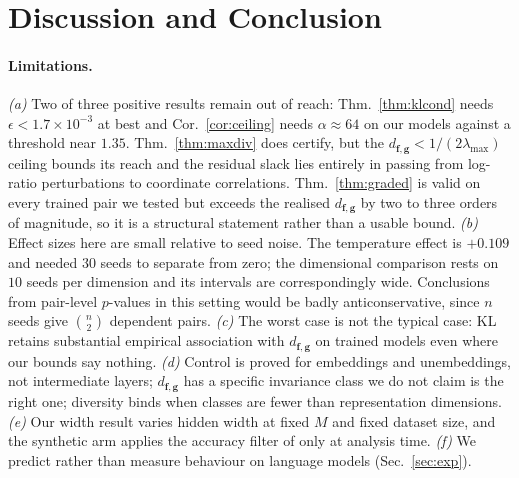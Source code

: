 \documentclass[10pt,letterpaper,twocolumn]{article}
\newcommand{\bff}{\mathbf{f}}
\newcommand{\bfg}{\mathbf{g}}
\newcommand{\dfg}{d_{\bff,\bfg}}
\theoremstyle{plain}
\theoremstyle{definition}
\theoremstyle{remark}
\begin{document}
\section{Discussion and Conclusion}
\label{sec:discussion}

\paragraph{Limitations.}
\emph{(a)} Two of three positive results remain out of reach:
Thm.~\ref{thm:klcond} needs $\epsilon<1.7\times10^{-3}$ at best and
Cor.~\ref{cor:ceiling} needs $\alpha\approx64$ on our models against a
threshold near $1.35$. Thm.~\ref{thm:maxdiv} does certify, but the
$\dfg<1/(2\lambda_{\max})$ ceiling bounds its reach and the residual slack lies
entirely in passing from log-ratio perturbations to coordinate correlations.
Thm.~\ref{thm:graded} is valid on every trained pair we tested but exceeds the
realised $\dfg$ by two to three orders of magnitude, so it is a structural
statement rather than a usable bound.
\emph{(b)} Effect sizes here are small relative to seed noise. The temperature
effect is $+0.109$ and needed $30$ seeds to separate from zero; the dimensional
comparison rests on $10$ seeds per dimension and its intervals are
correspondingly wide. Conclusions from pair-level $p$-values in this setting
would be badly anticonservative, since $n$ seeds give $\binom{n}{2}$ dependent
pairs.
\emph{(c)} The worst case is not the typical case: KL retains substantial
empirical association with $\dfg$ on trained models even where our bounds say
nothing. \emph{(d)} Control is proved for embeddings and unembeddings, not
intermediate layers; $\dfg$ has a specific invariance class we do not claim is
the right one; diversity binds when classes are fewer than representation
dimensions. \emph{(e)} Our width result varies hidden width at fixed $M$ and
fixed dataset size, and the synthetic arm applies the accuracy filter of
\citet{roeder2021} only at analysis time. \emph{(f)} We predict rather than measure behaviour on language models
(Sec.~\ref{sec:exp}).
\end{document}
